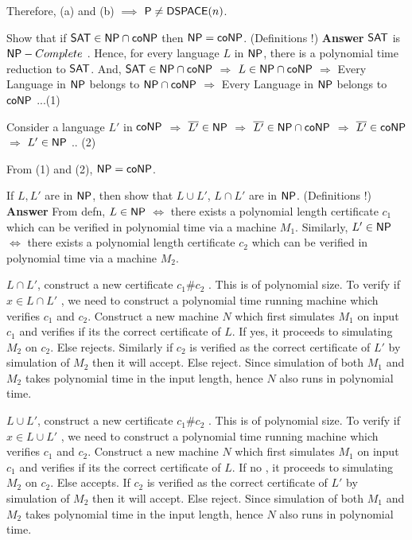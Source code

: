 \documentclass[addpoints,12pt]{exam}
\begin{document}
\begin{questions}
Therefore, (a) and (b) $\implies$ ${\mathsf{P}} \neq {\ensuremath{\mathsf{DSPACE}}}(n)$.

\question[5]
Show that if ${\mathsf{SAT}} \in {\ensuremath{\mathsf{NP}}} \cap {\ensuremath{\mathsf{co}}}{\ensuremath{\mathsf{NP}}}$ then ${\mathsf{NP}} = {\mathsf{co}}{\mathsf{NP}}$. (Definitions !) \newline
\textbf{Answer} \newline
${\mathsf{SAT}}$ is ${\mathsf{NP}}-Complete$ . Hence, for every language $L$ in ${\mathsf{NP}}$, there is a polynomial time reduction to ${\mathsf{SAT}}$. And,
${\mathsf{SAT}} \in {\ensuremath{\mathsf{NP}}} \cap {\ensuremath{\mathsf{co}}}{\ensuremath{\mathsf{NP}}}$ $\Longrightarrow$ $L \in {\ensuremath{\mathsf{NP}}} \cap {\ensuremath{\mathsf{co}}}{\ensuremath{\mathsf{NP}}}$ $\Longrightarrow$ Every Language in ${\mathsf{NP}}$ belongs to ${\mathsf{NP}} \cap {\ensuremath{\mathsf{co}}}{\ensuremath{\mathsf{NP}}}$ $\Longrightarrow$ Every Language in ${\mathsf{NP}}$
 belongs to ${\mathsf{co}}{\mathsf{NP}}$ ...(1) \newline
 
 Consider a language $L'$ in ${\mathsf{co}}{\mathsf{NP}}$ $\Longrightarrow$ $\overline{L'} \in {\ensuremath{\mathsf{NP}}}$ $\Longrightarrow$ $\overline{L'} \in {\ensuremath{\mathsf{NP}}} \cap {\ensuremath{\mathsf{co}}}{\ensuremath{\mathsf{NP}}}$
 $\Longrightarrow$ $\overline{L'} \in {\ensuremath{\mathsf{co}}}{\ensuremath{\mathsf{NP}}}$ $\Longrightarrow$ $L' \in {\ensuremath{\mathsf{NP}}}$ .. (2)
 
 From (1) and (2), ${\mathsf{NP}} = {\mathsf{co}}{\mathsf{NP}}$.


\question[5]
If $L, L'$ are in ${\mathsf{NP}}$, then show that $L \cup L'$, $L \cap L'$ are in ${\mathsf{NP}}$. (Definitions !) \newline
\textbf{Answer} \newline
From defn, $L \in {\ensuremath{\mathsf{NP}}}$ $\Leftrightarrow$ there exists a polynomial length certificate $c_{1}$ which can be verified in polynomial time via a machine $M_{1}$. \newline
Similarly, $L' \in {\ensuremath{\mathsf{NP}}}$ $\Leftrightarrow$ there exists a polynomial length certificate $c_{2}$ which can be verified in polynomial time via a machine $M_{2}$. \newline

$L \cap L'$, construct a new certificate $c_{1}\#c_{2}$ . This is of polynomial size. To verify if $x \in L \cap L'$ , we need to construct a polynomial time running machine
which verifies $c_{1}$ and $c_{2}$. Construct a new machine $N$ which first simulates $M_{1}$ on input $c_{1}$ and verifies if its the correct certificate of $L$.
If yes, it proceeds to simulating $M_{2}$ on $c_{2}$. Else rejects. Similarly if $c_{2}$ is verified as the correct certificate of $L'$ by simulation of $M_{2}$ then it will accept. Else reject.
Since simulation of both $M_{1}$ and $M_{2}$ takes polynomial time in the input length, hence $N$ also runs in polynomial time. \newline

$L \cup L'$, construct a new certificate $c_{1}\#c_{2}$ . This is of polynomial size. To verify if $x \in L \cup L'$ , we need to construct a polynomial time running machine
which verifies $c_{1}$ and $c_{2}$. Construct a new machine $N$ which first simulates $M_{1}$ on input $c_{1}$ and verifies if its the correct certificate of $L$.
If no , it proceeds to simulating $M_{2}$ on $c_{2}$. Else accepts. If $c_{2}$ is verified as the correct certificate of $L'$ by simulation of $M_{2}$ then it will accept. Else reject.
Since simulation of both $M_{1}$ and $M_{2}$ takes polynomial time in the input length, hence $N$ also runs in polynomial time.


\end{questions}
\end{document}
